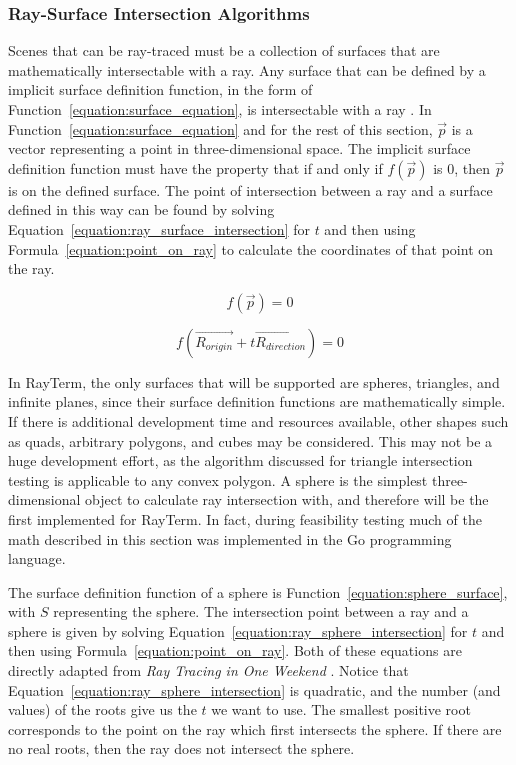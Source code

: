 \documentclass[11pt]{article}
\def\widow#1{\vskip #1\vbadness10000\penalty-200\vskip-#1}
\def\littlesection#1{
  \widow{2cm}
  \vskip 0.5cm
  \noindent{\bf #1}
  \vskip 0.0001cm
}
\newcommand{\name}{{\sc RayTerm}}
\newcommand{\rayorg}{\vec{R_{origin}}}
\newcommand{\raydir}{\vec{R_{direction}}}
\begin{document}
\subsubsection{Ray-Surface Intersection Algorithms}
\label{sec:method:ray_surface_intersection_algorithms}
Scenes that can be ray-traced must be a collection of surfaces that are mathematically intersectable with a ray.
Any surface that can be defined by a implicit surface definition function, in the form of Function~\ref{equation:surface_equation}, is intersectable with a ray \cite{pharr2016physically}.
In Function~\ref{equation:surface_equation} and for the rest of this section, $\vec{p}$ is a vector representing a point in three-dimensional space.
The implicit surface definition function must have the property that if and only if $f(\vec{p})$ is $0$, then $\vec{p}$ is on the defined surface.
The point of intersection between a ray and a surface defined in this way can be found by solving Equation~\ref{equation:ray_surface_intersection} for $t$ and then using Formula~\ref{equation:point_on_ray} to calculate the coordinates of that point on the ray.

\begin{equation}
  \label{equation:surface_equation}
  f(\vec{p}) = 0
\end{equation}

\begin{equation}
  \label{equation:ray_surface_intersection}
  f(\rayorg + t\raydir) = 0
\end{equation}

In \name, the only surfaces that will be supported are spheres, triangles, and infinite planes, since their surface definition functions are mathematically simple.
If there is additional development time and resources available, other shapes such as quads, arbitrary polygons, and cubes may be considered.
This may not be a huge development effort, as the algorithm discussed for triangle intersection testing is applicable to any convex polygon.
A sphere is the simplest three-dimensional object to calculate ray intersection with, and therefore will be the first implemented for \name.
In fact, during feasibility testing much of the math described in this section was implemented in the Go programming language.

\littlesection{Ray-Sphere Intersection}

The surface definition function of a sphere is Function~\ref{equation:sphere_surface}, with $S$ representing the sphere.
The intersection point between a ray and a sphere is given by solving Equation~\ref{equation:ray_sphere_intersection} for $t$ and then using Formula~\ref{equation:point_on_ray}.
Both of these equations are directly adapted from {\it Ray Tracing in One Weekend} \cite{shirley2016ray}.
Notice that Equation~\ref{equation:ray_sphere_intersection} is quadratic, and the number (and values) of the roots give us the $t$ we want to use.
The smallest positive root corresponds to the point on the ray which first intersects the sphere.
If there are no real roots, then the ray does not intersect the sphere.
\end{document}
